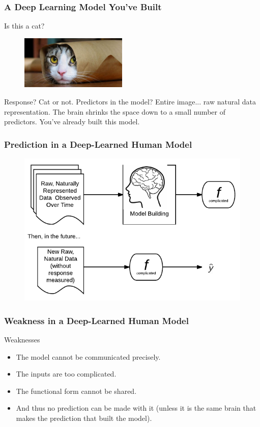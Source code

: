 \documentclass[slides]{beamer} %
\begin{document}
\begin{frame}\frametitle{A Deep Learning Model You've Built}

Is this a cat?

\begin{figure}
\centering
\includegraphics[width=2in]{cat.jpg}
\end{figure}


Response? Cat or not. Predictors in the model? Entire image... raw natural data representation. The brain shrinks the space down to a small number of predictors. You've already built this model. 

	
\end{frame}

\begin{frame}\frametitle{Prediction in a Deep-Learned Human Model}


\begin{figure}
\centering
\includegraphics[width=4.5in]{human_learning_weakness}
\end{figure}

\end{frame}

\begin{frame}\frametitle{Weakness in a Deep-Learned Human Model}

\begin{block}{Weaknesses}
\begin{itemize}
\item The model cannot be communicated precisely.
\item The inputs are too complicated.
\item The functional form cannot be shared.
\item And thus no prediction can be made with it (unless it is the same brain that makes the prediction that built the model).
\end{itemize}
\end{block}


	
\end{frame}
\end{document}

